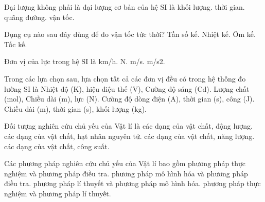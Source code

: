 \begin{ex}
Đại lượng không phải là đại lượng cơ bản của hệ SI là
\choice
{khối lượng.}
{thời gian.}
{quãng đường.}
{\True vận tốc.}
\end{ex}

\begin{ex}
Dụng cụ nào sau đây dùng để đo vận tốc tức thời?
\choice
{Tần số kế.}
{Nhiệt kế.}
{Ôm kế.}
{\True Tốc kế.}
\end{ex}

\begin{ex}
Đơn vị của lực trong hệ SI là
\choice
{km/h.}
{\True N.}
{m/s.}
{m/s2.}
\end{ex}

\begin{ex}
Trong các lựa chọn sau, lựa chọn tất cả các đơn vị đều có trong hệ thống đo lường SI là
\choice
{Nhiệt độ (K), hiệu điệu thế (V), Cường độ sáng (Cd).}
{Lượng chất (mol), Chiều dài (m), lực (N).}
{Cường độ dòng điện (A), thời gian (s), công (J).}
{\True Chiều dài (m), thời gian (s), khối lượng (kg).}
\end{ex}

\begin{ex}
Đối tượng nghiên cứu chủ yếu của Vật lí là
\choice
{các dạng của vật chất, động lượng.}
{các dạng của vật chất, hạt nhân nguyên tử.}
{\True các dạng của vật chất, năng lượng.}
{các dạng của vật chất, công suất.}
\end{ex}

\begin{ex}
Các phương pháp nghiên cứu chủ yếu của Vật lí bao gồm
\choice
{phương pháp thực nghiệm và phương pháp điều tra.}
{phương pháp mô hình hóa và phương pháp điều tra.}
{phương pháp lí thuyết và phương pháp mô hình hóa.}
{\True phương pháp thực nghiệm và phương pháp lí thuyết.}
\end{ex}

